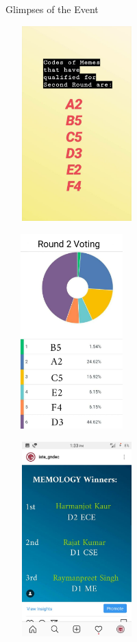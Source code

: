 \documentclass[12pt, a4 paper]{article}
\begin{document}
\begin{center}
\Huge Glimpses of the Event

\medskip

\begin{multicols}{2}
\includegraphics[width=5.5cm, height=7.5cm]{image7.jpg}

\columnbreak
\includegraphics[width=5.1cm, height=7.5cm]{image9.jpg}
\label{fig:Round 2 offline voting}
\end{multicols}

\includegraphics[width=5.5cm, height=7.5cm]{image5.jpeg}

\end{center}
\end{document}
